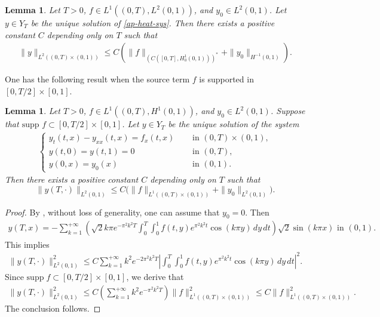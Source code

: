 \documentclass[11pt, reqno]{amsart}
\theoremstyle{plain}
\newtheorem{lemma}[thm]{Lemma}
\numberwithin{equation}{section}
\begin{document}
\begin{lemma} \label{lem-B2}
Let $T > 0$, $f \in L^1((0, T), L^2(0, 1))$, and $y_0 \in L^2(0, 1)$. Let $y \in Y_T$ be the unique solution of \eqref{ap-heat-sys}. Then there exists a positive constant $C$ depending only on $T$ such that
\begin{align}	\label{ap-heat-fx-L2}
	\|y\|_{L^2((0, T) \times (0, 1))} \leq C  \left(\|f\|_{\left(C \left([0, T], H^1_0(0, 1) \right)  \right)^*} + \|y_0\|_{H^{-1}(0, 1)} \right). 
\end{align}

\end{lemma}



One has the following result when the source term $f$ is supported in $[0, T/2] \times [0, 1]$.

 \begin{lemma} \label{lem-fx-L1} Let $T > 0$,  $f \in L^1((0, T),  H^1(0, 1))$, and $y_0 \in L^2(0, 1)$. Suppose that $\mbox{supp } f \subset [0, T/2] \times [0, 1]$. Let $y \in Y_T$ be the unique solution of the system 
 \begin{align}
	    \begin{cases}
                y_{t}(t, x) - y_{xx} (t, x)= f_{x}(t, x)  \quad &\text{ in } (0, T) \times (0, 1), \\
                y(t, 0) = y(t, 1) = 0 &\text{ in } (0, T), \\
                y(0, x) = y_0(x)  &\text{ in } (0, 1).
            \end{cases}
\end{align}
Then there exists a positive constant $C$ depending only on $T$ such that
$$
\| y(T, \cdot)\|_{L^2(0, 1)} \le C \Big( \| f \|_{L^1((0, T) \times (0, 1))} + \| y_0 \|_{L^2(0, 1)} \Big). 
$$
\end{lemma}

\begin{proof} By , without loss of generality, one can assume that $y_0 = 0$. Then 
\begin{align*}
y(T, x) = - \sum_{k = 1}^{+\infty} \left( \sqrt{2} k \pi e^{-  \pi^2 k^2 T} \int_0^T \int_0^1 f(t, y) e^{\pi^2 k^2 t} \cos (k \pi y) \, dy \, dt \right) \sqrt{2} \sin (k \pi x) \mbox{ in } (0, 1). 
\end{align*}
This implies 
\begin{align*}
\| y(T, \cdot) \|_{L^2(0, 1)}^2 \le C \sum_{k = 1}^{+\infty} k^2 e^{- 2 \pi^2 k^2 T} \left| \int_0^T \int_0^1 f(t, y) e^{\pi^2 k^2 t} \cos (k \pi y) \, dy \, dt \right|^2. 
\end{align*}
Since $\mathrm{supp} \; f \subset [0, T/2] \times [0, 1]$, we derive that 
\begin{align*}
\| y(T, \cdot) \|_{L^2(0, 1)}^2 \leq C \left( \sum_{k = 1}^{+\infty} k^2 e^{- \pi^2 k^2 T} \right) \| f\|_{L^1((0, T) \times (0, 1))}^2 \leq C \|f\|^2_{L^1((0, T) \times (0, 1))}. 
\end{align*}
The conclusion follows. 
\end{proof}
\end{document}
